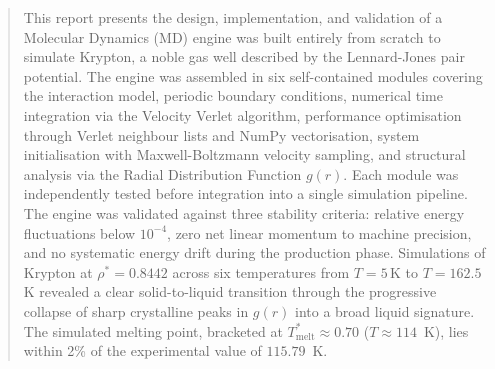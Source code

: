 

\newpage
\begin{abstract}
\noindent
This report presents the design, implementation, and validation of a Molecular
Dynamics (MD) engine was built entirely from scratch to simulate Krypton, a noble
gas well described by the Lennard-Jones pair potential. The engine was assembled
in six self-contained modules covering the interaction model, periodic boundary conditions, numerical time integration via the Velocity Verlet algorithm,
performance optimisation through Verlet neighbour lists and NumPy vectorisation,
system initialisation with Maxwell-Boltzmann velocity sampling, and structural
analysis via the Radial Distribution Function $g(r)$. Each module was
independently tested before integration into a single simulation pipeline. The
engine was validated against three stability criteria: relative energy
fluctuations below $10^{-4}$, zero net linear momentum to machine precision, and
no systematic energy drift during the production phase. Simulations of Krypton
at $\rho^* = 0.8442$ across six temperatures from $T = 5$\,K to
$T = 162.5$\,K revealed a clear solid-to-liquid transition through the
progressive collapse of sharp crystalline peaks in $g(r)$ into a broad liquid
signature. The simulated melting point, bracketed at $T^*_\text{melt} \approx
0.70$ ($T \approx 114$\, K), lies within 2\% of the experimental value of $115.79$\, K.
\end{abstract}